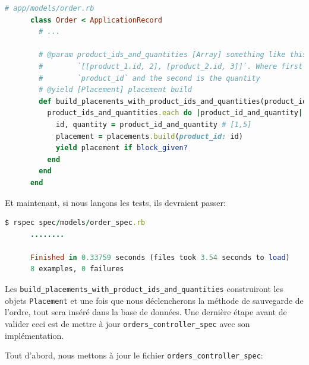 \documentclass[]{report}
\begin{document}
    \begin{scriptsize}
      \begin{lstlisting}[language=ruby]
      # app/models/order.rb
      class Order < ApplicationRecord
        # ...

        # @param product_ids_and_quantities [Array] something like this
        #        `[[product_1.id, 2], [product_2.id, 3]]`. Where first item is
        #        `product_id` and the second is the quantity
        # @yield [Placement] placement build
        def build_placements_with_product_ids_and_quantities(product_ids_and_quantities)
          product_ids_and_quantities.each do |product_id_and_quantity|
            id, quantity = product_id_and_quantity # [1,5]
            placement = placements.build(product_id: id)
            yield placement if block_given?
          end
        end
      end
      \end{lstlisting}
    \end{scriptsize}

    Et maintenant, si nous lançons les tests, ils devraient passer:

    \begin{scriptsize}
      \begin{lstlisting}[language=ruby]
      $ rspec spec/models/order_spec.rb
      ........

      Finished in 0.33759 seconds (files took 3.54 seconds to load)
      8 examples, 0 failures
      \end{lstlisting}
    \end{scriptsize}

    Les \verb|build_placements_with_product_ids_and_quantities| construiront les objets \verb|Placement| et une fois que nous déclencherons la méthode de sauvegarde de l'ordre, tout sera inséré dans la base de données. Une dernière étape avant de valider ceci est de mettre à jour \verb|orders_controller_spec| avec son implémentation.

    Tout d'abord, nous mettons à jour le fichier \verb|orders_controller_spec|:
\end{document}
